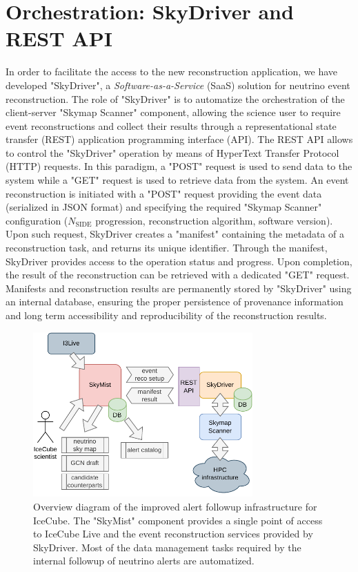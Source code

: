 \documentclass[a4paper,11pt]{article}
\begin{document}
\section{Orchestration: SkyDriver and REST API}
In order to facilitate the access to the new reconstruction application, we have developed "SkyDriver", a \emph{Software-as-a-Service} (SaaS) solution for neutrino event reconstruction. The role of "SkyDriver" is to automatize the orchestration of the client-server "Skymap Scanner" component, allowing the science user to require event reconstructions and collect their results through a representational state transfer (REST) \cite{fielding2000architectural} application programming interface (API). The REST API allows to control the "SkyDriver" operation by means of HyperText Transfer Protocol (HTTP) requests. In this paradigm, a "POST" request is used to send data to the system while a "GET" request is used to retrieve data from the system. An event reconstruction is initiated with a "POST" request providing the event data (serialized in JSON format) and specifying the required "Skymap Scanner" configuration ($N_\mathrm{SIDE}$ progression, reconstruction algorithm, software version). Upon such request, SkyDriver creates a "manifest" containing the metadata of a reconstruction task, and returns its unique identifier. Through the manifest, SkyDriver provides access to the operation status and progress. Upon completion, the result of the reconstruction can be retrieved with a dedicated "GET" request. Manifests and reconstruction results are permanently stored by "SkyDriver" using an internal database, ensuring the proper persistence of provenance information and long term accessibility and reproducibility of the reconstruction results.

\begin{figure}
    \centering
    \includegraphics[width=0.75\textwidth]{figures/i3infra.pdf}
    \caption{Overview diagram of the improved alert followup infrastructure for IceCube. The "SkyMist" component provides a single point of access to IceCube Live and the event reconstruction services provided by SkyDriver. Most of the data management tasks required by the internal followup of neutrino alerts are automatized.}
    \label{fig:skymist}
\end{figure}
\end{document}
